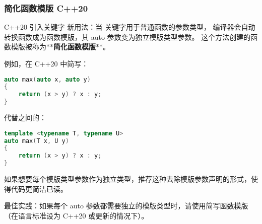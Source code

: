 \documentclass[../../LearnCpp.tex]{subfiles}
\begin{document}
\subsubsection*{简化函数模版 C++20}

C++20 引入关键字  新用法：当  关键字用于普通函数的参数类型，
编译器会自动转换函数成为函数模版，其 auto 参数变为独立模版类型参数。
这个方法创建的函数模版被称为**\textbf{简化函数模版}**。

例如，在 C++20 中简写：

\begin{lstlisting}[language=C++]
auto max(auto x, auto y)
{
    return (x > y) ? x : y;
}
\end{lstlisting}

代替之间的：

\begin{lstlisting}[language=C++]
template <typename T, typename U>
auto max(T x, U y)
{
    return (x > y) ? x : y;
}
\end{lstlisting}

如果想要每个模版类型参数作为独立类型，推荐这种去除模版参数声明的形式，使得代码更简洁已读。

最佳实践：如果每个 auto 参数都需要独立的模版类型时，请使用简写函数模版（在语言标准设为 C++20 或更新的情况下）。
\end{document}
